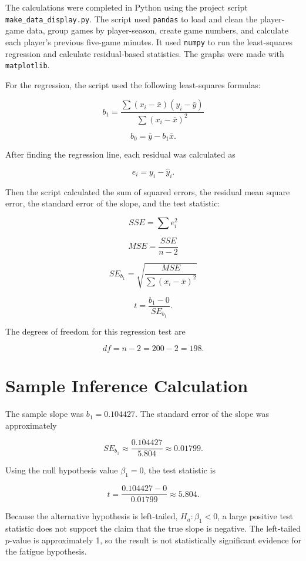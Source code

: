 \documentclass[12pt]{article}
\begin{document}
The calculations were completed in Python using the project script \texttt{make\_data\_display.py}. The script used \texttt{pandas} to load and clean the player-game data, group games by player-season, create game numbers, and calculate each player's previous five-game minutes. It used \texttt{numpy} to run the least-squares regression and calculate residual-based statistics. The graphs were made with \texttt{matplotlib}.

For the regression, the script used the following least-squares formulas:

\[
b_1 = \frac{\sum (x_i-\bar{x})(y_i-\bar{y})}{\sum (x_i-\bar{x})^2}
\]

\[
b_0 = \bar{y} - b_1\bar{x}.
\]

After finding the regression line, each residual was calculated as

\[
e_i = y_i - \hat{y}_i.
\]

Then the script calculated the sum of squared errors, the residual mean square error, the standard error of the slope, and the test statistic:

\[
SSE = \sum e_i^2
\]

\[
MSE = \frac{SSE}{n-2}
\]

\[
SE_{b_1} = \sqrt{\frac{MSE}{\sum (x_i-\bar{x})^2}}
\]

\[
t = \frac{b_1 - 0}{SE_{b_1}}.
\]

The degrees of freedom for this regression test are

\[
df = n - 2 = 200 - 2 = 198.
\]

\section*{Sample Inference Calculation}

The sample slope was $b_1 = 0.104427$. The standard error of the slope was approximately

\[
SE_{b_1} \approx \frac{0.104427}{5.804} \approx 0.01799.
\]

Using the null hypothesis value $\beta_1 = 0$, the test statistic is

\[
t = \frac{0.104427 - 0}{0.01799} \approx 5.804.
\]

Because the alternative hypothesis is left-tailed, $H_a: \beta_1 < 0$, a large positive test statistic does not support the claim that the true slope is negative. The left-tailed $p$-value is approximately 1, so the result is not statistically significant evidence for the fatigue hypothesis.
\end{document}
